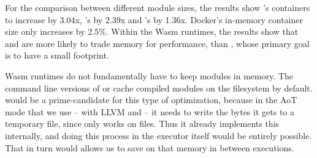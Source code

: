 For the comparison between different module sizes, the results show 's containers to increase by 3.04x, 's by 2.39x and 's by 1.36x. Docker's in-memory container size only increases by 2.5\%. Within the Wasm runtimes, the results show that  and  are more likely to trade memory for performance, than , whose primary goal is to have a small footprint.

Wasm runtimes do not fundamentally have to keep modules in memory. The command line versions of  or  cache compiled modules on the filesystem by default.  would be a prime-candidate for this type of optimization, because in the AoT mode that we use -- with LLVM and  -- it needs to write the bytes it gets to a temporary file, since  only works on files. Thus it already implements this internally, and doing this process in the executor itself would be entirely possible. That in turn would allows us to save on that memory in between executions.

